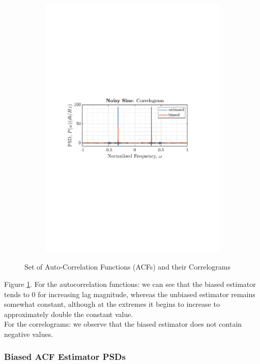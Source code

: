 \documentclass[12pt]{article}
\begin{document}
\begin{figure}[H]
\begin{subfigure}{0.49\textwidth}
			\includegraphics[trim={2.2cm 11.2cm 3.15cm  11.2cm}, clip, width=\textwidth]{../MATLAB/figures/q1_3a_fig03.pdf} 
		\end{subfigure}
		\captionsetup{justification=centering}
		\caption{Set of Auto-Correlation Functions (ACFs) and their Correlograms}
		\label{fig: 1-3a}
	\end{figure}
	
	Figure \ref{fig: 1-3a}. For the autocorrelation functions: we can see that the biased estimator tends to 0 for increasing lag magnitude, whereas the unbiased estimator remains somewhat constant, although at the extremes it begins to increase to approximately double the constant value.\\
	For the correlograms: we observe that the biased estimator does not contain negative values.
	
	\subsubsection{Biased ACF Estimator PSDs}
\end{document}
